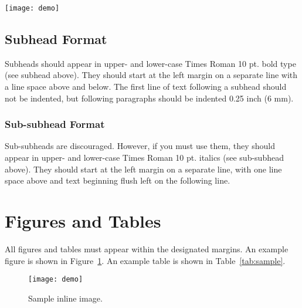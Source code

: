 \documentclass[letterpaper,10pt,twocolumn]{article} %
\begin{document}
           \begin{figure*}[htb]
	 			\centering
	 			\texttt{[image: demo]}
	 			\caption{Sample spanning image.}
                \label{fig:spanning}
			\end{figure*}
            
\subsection{Subhead Format}

Subheads should appear in upper- and lower-case Times Roman 10 pt. bold type (see subhead above). 
They should start at the left margin on a separate line with a line space above and below. 
The first line of text following a subhead should not be indented, but following paragraphs should be indented 0.25 inch (6 mm).

\subsubsection{Sub-subhead Format}

Sub-subheads are discouraged. 
However, if you must use them, they should appear in upper- and lower-case Times Roman 10 pt. italics (see sub-subhead above). 
They should start at the left margin on a separate line, with one line space above and text beginning flush left on the following line. 

\section{Figures and Tables}

All figures and tables must appear within the designated margins. An example figure is shown in Figure~\ref{fig:inline}. An example table is shown in Table~\ref{tab:sample}.

			\begin{figure}[th]
	 			\centering
	 			\texttt{[image: demo]}
                \caption{Sample inline image.}
                \label{fig:inline}
			\end{figure} 
            
\end{document}

